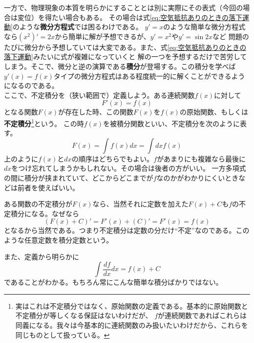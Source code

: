 \documentclass[a4j,dvipdfmx]{jsarticle}
\begin{document}
                一方で、物理現象の本質を明らかにすることとは別に実際にその表式（今回の場合は変位）を得たい場合もある。
                その場合は式\ref{eq:空気抵抗ありのときの落下運動}のような\textbf{微分方程式}では困るわけである。
                $y'=x$のような簡単な微分方程式なら$(x^2)'=2x$から簡単に解が予想できるが、$y'=x^2$や$y'=\sin 2x$など
                問題のたびに微分から予想していては大変である。また、式\ref{eq:空気抵抗ありのときの落下運動}みたいに式が複雑になっていくと
                解の一つを予想するだけで苦労してしまう。そこで、微分と逆の演算である\textbf{積分}が登場する。この積分を学べば
                $y'(x)=f(x)$タイプの微分方程式はある程度統一的に解くことができるようになるのである。\\

                ここで、不定積分を（狭い範囲で）定義しよう。ある連続関数$f(x)$に対して
                \begin{equation}
                    F'(x)=f(x) \label{eq:原始関数定義}
                \end{equation}
                となる関数$F(x)$が存在した時、この関数$F(x)$を$f(x)$の原始関数、もしくは\textbf{不定積分}\footnote{実はこれは不定積分ではなく、原始関数の定義である。基本的に原始関数と不定積分が等しくなる保証はないわけだが、
                $f$が連続関数であればこれらは同義になる。我々は今基本的に連続関数のみ扱いたいわけだから、これらを同じものとして扱っている。}という。
                この時$f(x)$を被積分関数といい、不定積分を次のように表す。
                \begin{equation}
                    F(x)=\int f(x)dx = \int dx f(x) \label{eq:不定積分の書き方}
                \end{equation}
                上のように$f(x)$と$dx$の順序はどちらでもよい。$f$があまりにも複雑なら最後に$dx$をつけ忘れてしまうかもしれない。その場合は後者の方がいい。
                一方多項式の間に積分が挟まれていて、どこからどこまでが$f$なのかがわかりにくいときなどは前者を使えばいい。

                ある関数の不定積分が$F(x)$なら、当然それに定数を加えた$F(x)+C$も$f$の不定積分になる。なぜなら
                \begin{equation*}
                    (F(x)+C)'=F'(x)+(C)'=F'(x)=f(x)
                \end{equation*}
                となるから当然である。つまり不定積分は定数の分だけ``不定''なのである。このような任意定数を積分定数という。
                
                また、定義から明らかに
                \begin{equation}
                    \int \frac{df}{dx}dx = f(x)+C
                \end{equation}
                であることがわかる。もちろん常にこんな簡単な積分ばかりではない。
\end{document}
